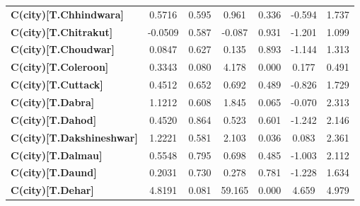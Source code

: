 \begin{center}
\begin{tabular}{lcccccc}
\textbf{C(city)[T.Chhindwara]}                                                                      &       0.5716  &        0.595     &     0.961  &         0.336        &       -0.594    &        1.737     \\
\textbf{C(city)[T.Chitrakut]}                                                                       &      -0.0509  &        0.587     &    -0.087  &         0.931        &       -1.201    &        1.099     \\
\textbf{C(city)[T.Choudwar]}                                                                        &       0.0847  &        0.627     &     0.135  &         0.893        &       -1.144    &        1.313     \\
\textbf{C(city)[T.Coleroon]}                                                                        &       0.3343  &        0.080     &     4.178  &         0.000        &        0.177    &        0.491     \\
\textbf{C(city)[T.Cuttack]}                                                                         &       0.4512  &        0.652     &     0.692  &         0.489        &       -0.826    &        1.729     \\
\textbf{C(city)[T.Dabra]}                                                                           &       1.1212  &        0.608     &     1.845  &         0.065        &       -0.070    &        2.313     \\
\textbf{C(city)[T.Dahod]}                                                                           &       0.4520  &        0.864     &     0.523  &         0.601        &       -1.242    &        2.146     \\
\textbf{C(city)[T.Dakshineshwar]}                                                                   &       1.2221  &        0.581     &     2.103  &         0.036        &        0.083    &        2.361     \\
\textbf{C(city)[T.Dalmau]}                                                                          &       0.5548  &        0.795     &     0.698  &         0.485        &       -1.003    &        2.112     \\
\textbf{C(city)[T.Daund]}                                                                           &       0.2031  &        0.730     &     0.278  &         0.781        &       -1.228    &        1.634     \\
\textbf{C(city)[T.Dehar]}                                                                           &       4.8191  &        0.081     &    59.165  &         0.000        &        4.659    &        4.979     \\

\end{tabular}
\end{center}
